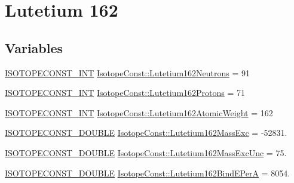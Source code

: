 \hypertarget{group___isotope_const-_lutetium-_lu162}{}\section{Lutetium 162}
\label{group___isotope_const-_lutetium-_lu162}
\subsection*{Variables}
\begin{DoxyCompactItemize}
\item 
\mbox{\hyperlink{group___isotope_const-_macros_ga5f18360b3e99483a35c32d789e62621c}{I\+S\+O\+T\+O\+P\+E\+C\+O\+N\+S\+T\+\_\+\+I\+NT}} \mbox{\hyperlink{group___isotope_const-_lutetium-_lu162_ga103b0651ac7ac22e0b83faf590196209}{Isotope\+Const\+::\+Lutetium162\+Neutrons}} = 91
\item 
\mbox{\hyperlink{group___isotope_const-_macros_ga5f18360b3e99483a35c32d789e62621c}{I\+S\+O\+T\+O\+P\+E\+C\+O\+N\+S\+T\+\_\+\+I\+NT}} \mbox{\hyperlink{group___isotope_const-_lutetium-_lu162_gaa6a62de9ada71f17903ed2886cadfc3d}{Isotope\+Const\+::\+Lutetium162\+Protons}} = 71
\item 
\mbox{\hyperlink{group___isotope_const-_macros_ga5f18360b3e99483a35c32d789e62621c}{I\+S\+O\+T\+O\+P\+E\+C\+O\+N\+S\+T\+\_\+\+I\+NT}} \mbox{\hyperlink{group___isotope_const-_lutetium-_lu162_gad88726ec210c116372ce3d7532c66e86}{Isotope\+Const\+::\+Lutetium162\+Atomic\+Weight}} = 162
\item 
\mbox{\hyperlink{group___isotope_const-_macros_ga8f45a7272ce02c0b4c65c44636ed719a}{I\+S\+O\+T\+O\+P\+E\+C\+O\+N\+S\+T\+\_\+\+D\+O\+U\+B\+LE}} \mbox{\hyperlink{group___isotope_const-_lutetium-_lu162_ga3ec3d656fc612efd23ac1be3e1b9cf00}{Isotope\+Const\+::\+Lutetium162\+Mass\+Exc}} = -\/52831.
\item 
\mbox{\hyperlink{group___isotope_const-_macros_ga8f45a7272ce02c0b4c65c44636ed719a}{I\+S\+O\+T\+O\+P\+E\+C\+O\+N\+S\+T\+\_\+\+D\+O\+U\+B\+LE}} \mbox{\hyperlink{group___isotope_const-_lutetium-_lu162_ga8a43bdda0c998ef868426dd73a7fb546}{Isotope\+Const\+::\+Lutetium162\+Mass\+Exc\+Unc}} = 75.
\item 
\mbox{\hyperlink{group___isotope_const-_macros_ga8f45a7272ce02c0b4c65c44636ed719a}{I\+S\+O\+T\+O\+P\+E\+C\+O\+N\+S\+T\+\_\+\+D\+O\+U\+B\+LE}} \mbox{\hyperlink{group___isotope_const-_lutetium-_lu162_ga646b7d306238ccc01296f2ee5c9e949d}{Isotope\+Const\+::\+Lutetium162\+Bind\+E\+PerA}} = 8054.
\item 

\end{DoxyCompactItemize}
